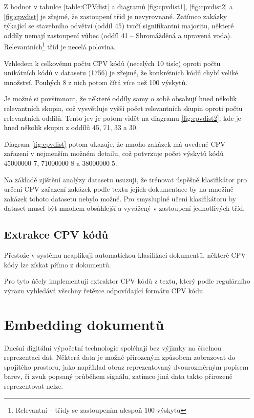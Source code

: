 \documentclass[thesis=M,czech]{FITthesis}[2019/12/23]
\begin{document}
Z hodnot v tabulce \ref{table:CPVdist} a diagramů \ref{fig:cpvdist1}, \ref{fig:cpvdist2} a \ref{fig:cpvdist} je zřejmé, že zastoupení tříd je nevyrovnané. Zatímco zakázky týkající se stavebního odvětví (oddíl 45) tvoří signifikantní majoritu, některé oddíly nemají zastoupení vůbec (oddíl 41 – Shromážděná a upravená voda). Relevantních\footnote{\label{not:relevant_class}Relevantní -- třídy se zastoupením alespoň 100 výskytů} tříd je necelá polovina.

Vzhledem k celkovému počtu CPV kódů (necelých 10 tisíc) oproti počtu unikátních kódů v datasetu (1756) je zřejmé, že konkrétních kódů chybí veliké množství. Pouhých 8 z nich potom čítá více než 100 výskytů.

Je možné si povšimnout, že některé oddíly samy o sobě obsahují hned několik relevantních skupin, což vysvětluje vyšší počet relevantních skupin oproti počtu relevantních oddílů. Tento jev je potom vidět na diagramu \ref{fig:cpvdist2}, kde je hned několik skupin z oddílů 45, 71, 33 a 30.

Diagram \ref{fig:cpvdist} potom ukazuje, že mnoho zakázek má uvedené CPV zařazení v nejmenším možném detailu, což potvrzuje počet výskytů kódů 45000000-7, 71000000-8 a 38000000-5.

Na základě zjištění analýzy datasetu usuzuji, že trénovat úspěšně klasifikátor pro určení CPV zařazení zakázek podle textu jejich dokumentace by na množině zakázek tohoto datasetu nebylo možné. Pro smysluplné učení klasifikátoru by dataset musel být mnohem obsáhlejší a vyvážený v zastoupení jednotlivých tříd.

\subsection{Extrakce CPV kódů}
\label{sec:cpv_extraction}

Přestože v systému neaplikuji automatickou klasifikaci dokumentů, některé CPV kódy lze získat přímo z dokumentů.

Pro tyto účely implementuji extraktor CPV kódů z textu, který podle regulárního výrazu vyhledává  všechny řetězce odpovídající formátu CPV kódu.

\newpage
\section{Embedding dokumentů}
\label{sec:document_embedding}
Dnešní digitální výpočetní technologie spoléhají bez výjimky na číselnou reprezentaci dat. Některá data je možné přirozeným způsobem zobrazovat do spojitého prostoru, jako například obraz reprezentovaný dvourozměrným popisem barev, či zvuk popsaný průběhem signálu, zatímco jiná data takto přirozeně reprezentovat nelze.
\end{document}
